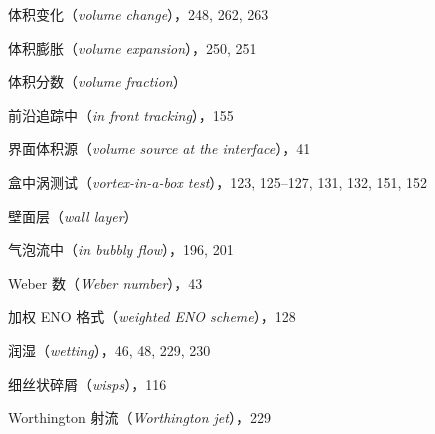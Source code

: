 \documentclass[11pt,a4paper,openany,fontset=none]{ctexbook}
\begin{document}
体积变化（\textit{volume change}），248, 262, 263\par
体积膨胀（\textit{volume expansion}），250, 251\par
体积分数（\textit{volume fraction}）\par
\quad 前沿追踪中（\textit{in front tracking}），155\par
界面体积源（\textit{volume source at the interface}），41\par
盒中涡测试（\textit{vortex-in-a-box test}），123, 125--127, 131, 132, 151, 152\par
壁面层（\textit{wall layer}）\par
\quad 气泡流中（\textit{in bubbly flow}），196, 201\par
Weber 数（\textit{Weber number}），43\par
加权 ENO 格式（\textit{weighted ENO scheme}），128\par
润湿（\textit{wetting}），46, 48, 229, 230\par
细丝状碎屑（\textit{wisps}），116\par
Worthington 射流（\textit{Worthington jet}），229\par
\endgroup
\end{document}
